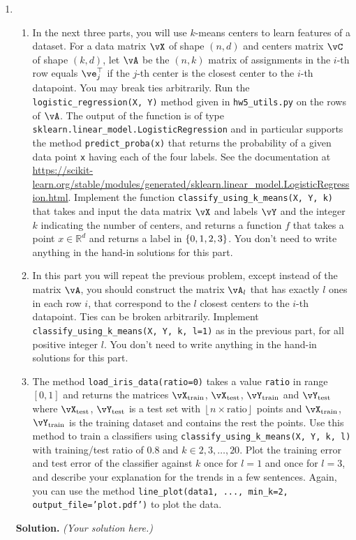 \documentclass{article}
\def\R{\mathbb{R}}
\theoremstyle{definition}
\theoremstyle{remark}
\newenvironment{Q}
{%
\clearpage
\item
}
{%
\phantom{s}
\bigskip
\textbf{Solution.}
\emph{(Your solution here.)}
}
\begin{document}
\begin{enumerate}
\begin{Q}
\begin{enumerate}
    \item
      In the next three parts, you will use $k$-means centers to learn features of a dataset. For a data matrix $\vX$ of shape $(n,d)$ and centers matrix $\vC$ of shape $(k,d)$, let $\vA$ be the $(n,k)$ matrix of assignments in the $i$-th row equals $\ve_j^\top$ if the $j$-th center is the closest center to the $i$-th datapoint. You may break ties arbitrarily. Run the \texttt{logistic\_regression(X, Y)} method given in \texttt{hw5\_utils.py} on the rows of $\vA$. The output of the function is of type \texttt{sklearn.linear\_model.LogisticRegression} and in particular supports the method \texttt{predict\_proba(x)} that returns the probability of a given data point \texttt{x} having each of the four labels.
      See the documentation at \url{https://scikit-learn.org/stable/modules/generated/sklearn.linear_model.LogisticRegression.html}.
      Implement the function \texttt{classify\_using\_k\_means(X, Y, k)} that takes and input the data matrix $\vX$ and labels $\vY$ and the integer $k$ indicating the number of centers, and returns a function $f$ that takes a point $x \in \R^d$ and returns a label in $\set{0,1,2,3}$. You don't need to write anything in the hand-in solutions for this part.

    \item
      In this part you will repeat the previous problem, except instead of the matrix $\vA$, you should construct the matrix $\vA_l$ that has exactly $l$ ones in each row $i$, that correspond to the $l$ closest centers to the $i$-th datapoint. Ties can be broken arbitrarily. Implement \texttt{classify\_using\_k\_means(X, Y, k, l=1)} as in the previous part, for all positive integer $l$. You don't need to write anything in the hand-in solutions for this part.

    \item
      The method \texttt{load\_iris\_data(ratio=0)} takes a value \texttt{ratio} in range $[0,1]$ and returns the matrices $\vX_\text{train}$, $\vX_\text{test}$, $\vY_\text{train}$ and $\vY_\text{test}$ where $\vX_\text{test}$, $\vY_\text{test}$ is a test set with $\left\lfloor n \times \text{ratio} \right\rfloor$ points and $\vX_\text{train}$, $\vY_\text{train}$ is the training dataset and contains the rest the points.
      Use this method to train a classifiers using \texttt{classify\_using\_k\_means(X, Y, k, l)} with training/test ratio of $0.8$ and $k \in {2, 3, \ldots, 20}$. Plot the training error and test error of the classifier against $k$ once for $l=1$ and once for $l=3$, and describe your explanation for the trends in a few sentences.
      Again, you can use the method \texttt{line\_plot(data1, ..., min\_k=2, output\_file='plot.pdf')} to plot the data.


\end{enumerate}
\end{Q}
\end{enumerate}
\end{document}
